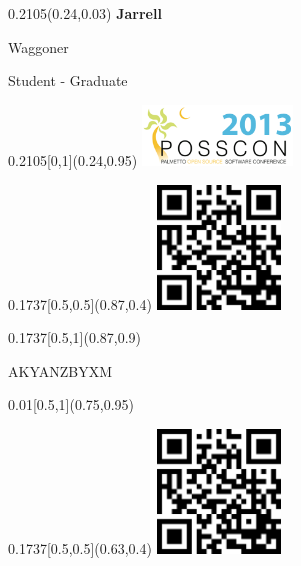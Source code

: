 \documentclass[a4paper]{article}
\begin{document}
\begin{textblock}{0.2105}(0.24,0.03)
  {\fontsize{36}{40} \textbf{Jarrell} } \\
  \begin{Large} Waggoner \end{Large}

  \vspace{2em}

  Student - Graduate
\end{textblock}

\begin{textblock}{0.2105}[0,1](0.24,0.95)
  \includegraphics[width=4cm]{fig/logo}
\end{textblock}


\begin{textblock}{0.1737}[0.5,0.5](0.87,0.4)
  \includegraphics[width=3.3cm]{fig/main}
\end{textblock}

\begin{textblock}{0.1737}[0.5,1](0.87,0.9)
  \begin{center}
    AKYANZBYXM
  \end{center}
\end{textblock}

\begin{textblock}{0.01}[0.5,1](0.75,0.95)
  \begin{center}
  \end{center}
\end{textblock}

\begin{textblock}{0.1737}[0.5,0.5](0.63,0.4)
  \includegraphics[width=3.3cm]{fig/main}
\end{textblock}
\end{document}
